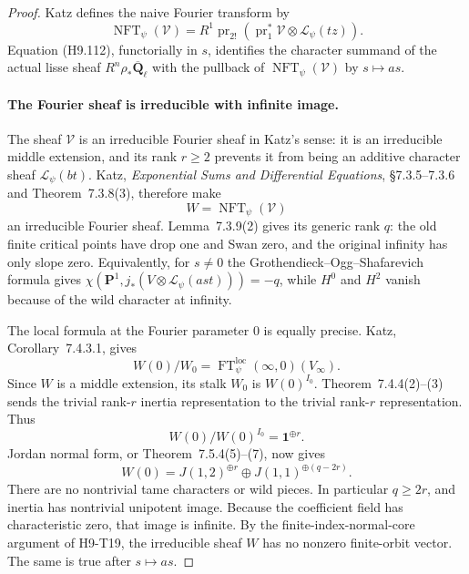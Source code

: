 \begin{proof}
Katz defines the naive Fourier transform by
\[
 \operatorname{NFT}_\psi(\mathcal V)
       =R^1\operatorname{pr}_{2!}
          (\operatorname{pr}_1^*\mathcal V
                         \otimes\mathcal L_\psi(tz)).
\]
Equation (H9.112), functorially in $s$, identifies the
character summand of the actual lisse sheaf
$R^n\rho_*\overline{\mathbf Q}_\ell$ with the
pullback of $\operatorname{NFT}_\psi(\mathcal V)$ by
$s\mapsto a s$.

\paragraph{The Fourier sheaf is irreducible with infinite image.}
The sheaf $\mathcal V$ is an irreducible Fourier sheaf in
Katz's sense: it is an irreducible middle extension, and
its rank $r\ge2$ prevents it from being an additive
character sheaf $\mathcal L_\psi(bt)$. Katz,
\emph{Exponential Sums and Differential Equations},
\S7.3.5--7.3.6 and Theorem~7.3.8(3), therefore make
\[
                     W=\operatorname{NFT}_\psi(\mathcal V)
\]
an irreducible Fourier sheaf. Lemma~7.3.9(2) gives its
generic rank $q$: the old finite critical points have
drop one and Swan zero, and the original infinity has
only slope zero. Equivalently, for $s\ne0$ the
Grothendieck--Ogg--Shafarevich formula gives
$\chi(\mathbf P^1,j_*(V\otimes\mathcal L_\psi(a s t)))=-q$,
while $H^0$ and $H^2$ vanish because of the wild character
at infinity.

The local formula at the Fourier parameter $0$ is equally
precise. Katz, Corollary~7.4.3.1, gives
\[
 W(0)/W_0
      =\operatorname{FT}^{\mathrm{loc}}_\psi(\infty,0)
                                                    (V_\infty).
\]
Since $W$ is a middle extension, its stalk $W_0$ is
$W(0)^{I_0}$. Theorem~7.4.4(2)--(3) sends the trivial
rank-$r$ inertia representation to the trivial rank-$r$
representation. Thus
\[
                W(0)/W(0)^{I_0}=\mathbf1^{\oplus r}.
\]
Jordan normal form, or Theorem~7.5.4(5)--(7), now gives
\[
             W(0)=J(1,2)^{\oplus r}
                         \oplus J(1,1)^{\oplus(q-2r)}.
                                                               \tag{H9.113}
\]
There are no nontrivial tame characters or wild pieces.
In particular $q\ge2r$, and inertia has nontrivial
unipotent image. Because the coefficient field has
characteristic zero, that image is infinite. By the
finite-index-normal-core argument of H9-T19, the
irreducible sheaf $W$ has no nonzero finite-orbit vector.
The same is true after $s\mapsto a s$.


\end{proof}
